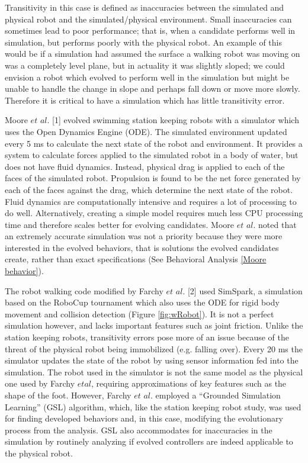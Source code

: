 \documentclass{sig-alternate}
\begin{document}
Transitivity in this case is defined as inaccuracies between the simulated and physical robot and the simulated/physical environment. Small inaccuracies can sometimes lead to poor performance; that is, when a candidate performs well in simulation, but performs poorly with the physical robot. An example of this would be if a simulation had assumed the surface a walking robot was moving on was a completely level plane, but in actuality it was slightly sloped; we could envision a robot which evolved to perform well in the simulation but might be unable to handle the change in slope and perhaps fall down or move more slowly. Therefore it is critical to have a simulation which has little transitivity error.

 Moore $et$ $al.$ [1] evolved swimming station keeping robots with a simulator which uses the Open Dynamics Engine (ODE). The simulated environment updated every 5 ms to calculate the next state of the robot and environment. It provides a system to calculate forces applied to the simulated robot in a body of water, but does not have fluid dynamics. Instead, physical drag is applied to each of the faces of the simulated robot. Propulsion is found to be the net force generated by each of the faces against the drag, which determine the next state of the robot. Fluid dynamics are computationally intensive and requires a lot of processing to do well. Alternatively, creating a simple model requires much less CPU processing time and therefore scales better for evolving candidates. Moore $et$ $al.$ noted that an extremely accurate simulation was not a priority because they were more interested in the evolved behaviors, that is solutions the evolved candidates create, rather than exact specifications (See Behavioral Analysis \ref{Moore behavior}).
 
 The robot walking code modified by Farchy $et$ $al.$ [2] used SimSpark, a simulation based on the RoboCup tournament which also uses the ODE for rigid body movement and collision detection (Figure \ref{fig:wRobot}). It is not a perfect simulation however, and lacks important features such as joint friction. Unlike the station keeping robots, transitivity errors pose more of an issue because of the threat of the physical robot being immobilized (e.g. falling over). Every 20 ms the simulator updates the state of the robot by using sensor information  fed into the simulation. The robot used in the simulator is not the same model as the physical one used by Farchy $et al$, requiring approximations of key features such as the shape of the foot. However, Farchy $et$ $al.$ employed a ``Grounded Simulation Learning'' (GSL) algorithm, which, like the station keeping robot study, was used for finding developed behaviors and, in this case, modifying the evolutionary process from the analysis. GSL also accommodates for inaccuracies in the simulation by routinely analyzing if evolved controllers are indeed applicable to the physical robot.
 
\end{document}
